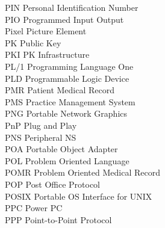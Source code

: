 \begin{tabbing}
    \>PIN \>\>Personal Identification Number\\

    \>PIO \>\>Programmed Input Output\\

    \>Pixel \>\>Picture Element\\

    \>PK \>\>Public Key\\

    \>PKI \>\>PK Infrastructure\\

    \>PL/1 \>\>Programming Language One\\

    \>PLD \>\>Programmable Logic Device\\

    \>PMR \>\>Patient Medical Record\\

    \>PMS \>\>Practice Management System\\

    \>PNG \>\>Portable Network Graphics\\

    \>PnP \>\>Plug and Play\\

    \>PNS \>\>Peripheral NS\\

    \>POA \>\>Portable Object Adapter\\

    \>POL \>\>Problem Oriented Language\\

    \>POMR \>\>Problem Oriented Medical Record\\

    \>POP \>\>Post Office Protocol\\

    \>POSIX \>\>Portable OS Interface for UNIX\\


    \>PPC \>\>Power PC\\

    \>PPP \>\>Point-to-Point Protocol\\




\end{tabbing}
